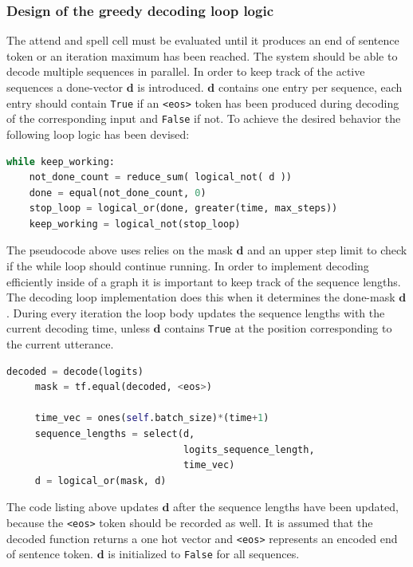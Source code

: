\subsubsection{Design of the greedy decoding loop logic}
The attend and spell cell must be evaluated until it produces an end of sentence token or an iteration maximum has been reached. The system should be able to decode multiple sequences in parallel. In order to keep track of the active sequences a done-vector $\mathbf{d}$ is introduced.  $\mathbf{d}$ contains one entry per sequence, each entry should contain \texttt{True} if an \texttt{<eos>} token has been produced during decoding of the corresponding input and \texttt{False} if not. 
To achieve the desired behavior the following loop logic has been devised:
\begin{lstlisting}[language=python]
while keep_working:
	not_done_count = reduce_sum( logical_not( d ))
	done = equal(not_done_count, 0)
	stop_loop = logical_or(done, greater(time, max_steps))
	keep_working = logical_not(stop_loop)
\end{lstlisting}
The pseudocode above uses relies on the mask $\mathbf{d}$ and an upper step limit to check if the while loop should continue running. In order to implement decoding efficiently inside of a graph it is important to keep track of the sequence lengths. The decoding loop implementation does this when it determines the done-mask $\mathbf{d}$. During every iteration the loop body updates the sequence lengths with the current decoding time, unless $\mathbf{d}$ contains \texttt{True} at the position corresponding to the current utterance.
\begin{lstlisting}[language=python]
     decoded = decode(logits)
     mask = tf.equal(decoded, <eos>)

     time_vec = ones(self.batch_size)*(time+1)
     sequence_lengths = select(d,
                               logits_sequence_length,
                               time_vec)
     d = logical_or(mask, d)
\end{lstlisting}
The code listing above updates $\mathbf{d}$ after the sequence lengths have been updated, because the \texttt{<eos>} token should be recorded as well. It is assumed that the decoded function returns a one hot vector and \texttt{<eos>} represents an encoded end of sentence token. $\mathbf{d}$ is initialized to \texttt{False} for all sequences. 

